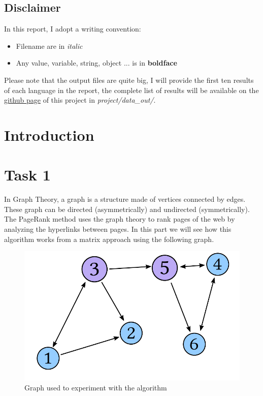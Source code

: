 \subsection*{Disclaimer}
In this report, I adopt a writing convention:
\begin{itemize}
    \item Filename are in \textit{italic}
    \item Any value, variable, string, object ... is in \textbf{boldface} 
\end{itemize}
Please note that the output files are quite big, I will provide the first ten results of each language in the report, the complete list of results will be available on the \href{https://github.com/PaxOwl/big-data-project}{github page} of this project in \textit{project/data\_out/}.
\section{Introduction}

\newpage
\section{Task 1}
\label{sec:task1}
In Graph Theory, a graph is a structure made of vertices connected by edges. These graph can be directed (asymmetrically) and undirected (symmetrically). The PageRank method uses the graph theory to rank pages of the web by analyzing the hyperlinks between pages. In this part we will see how this algorithm works from a matrix approach using the following graph.

\begin{figure}[htbp]
    \centering
    \includegraphics[width=.5\linewidth]{network.pdf}
    \caption{Graph used to experiment with the algorithm}\label{fig:network}
\end{figure}

